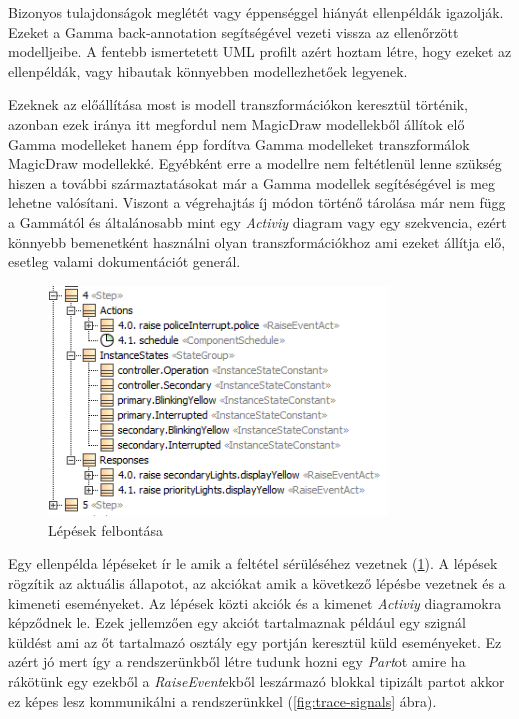 Bizonyos tulajdonságok meglétét vagy éppenséggel hiányát ellenpéldák igazolják. Ezeket a Gamma back-annotation segítségével vezeti vissza az ellenőrzött modelljeibe. A fentebb ismertetett UML profilt azért hoztam létre, hogy ezeket az ellenpéldák, vagy hibautak könnyebben modellezhetőek legyenek.

Ezeknek az előállítása most is modell transzformációkon keresztül történik, azonban ezek iránya itt megfordul nem MagicDraw modellekből állítok elő Gamma modelleket hanem épp fordítva Gamma modelleket transzformálok MagicDraw modellekké. Egyébként erre a modellre nem feltétlenül lenne szükség hiszen a további származtatásokat már a Gamma modellek segítéségével is meg lehetne valósítani. Viszont a végrehajtás íj módon történő tárolása már nem függ a Gammától és általánosabb mint egy \emph{Activiy} diagram vagy egy szekvencia, ezért könnyebb bemenetként használni olyan transzformációkhoz ami ezeket állítja elő, esetleg valami dokumentációt generál.

\begin{figure}[!ht]
	\centering
	\includegraphics[width=90mm, keepaspectratio]{figures/contribution/steps.png}
	\caption{Lépések felbontása}
	\label{fig:steps}
\end{figure}

Egy ellenpélda lépéseket ír le amik a feltétel sérüléséhez vezetnek (\ref{fig:steps}). A lépések rögzítik az aktuális állapotot, az akciókat amik a következő lépésbe vezetnek és a kimeneti eseményeket.
Az lépések közti akciók és a kimenet \emph{Activiy} diagramokra képződnek le. Ezek jellemzően egy akciót tartalmaznak például egy szignál küldést ami az őt tartalmazó osztály egy portján keresztül küld eseményeket. Ez azért jó mert így a rendszerünkből létre tudunk hozni egy \emph{Part}ot amire ha rákötünk egy ezekből a \emph{RaiseEvent}ekből leszármazó blokkal tipizált partot akkor ez képes lesz kommunikálni a rendszerünkkel (\ref{fig:trace-signals} ábra).

